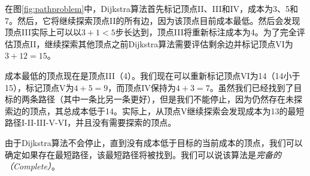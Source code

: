 
在图\ref{fig:pathproblem}中，Dijkstra算法首先标记顶点II、III和IV，成本为3、5和7。然后，它将继续探索顶点II的所有边，因为该顶点目前成本最低。然后会发现顶点III实际上可以以$3 + 1 <5$步长达到，顶点III将重新标注成本为4。为了完全评估顶点II，继续探索其他顶点之前Dijkstra算法需要评估剩余边并标记顶点VI为$3 + 12 = 15$。


成本最低的顶点现在是顶点III（4）。我们现在可以重新标记顶点VI为14（14小于15），标记顶点V为$4+5=9$，而顶点IV保持为$4+3=7$。虽然我们已经找到了目标的两条路径（其中一条比另一条更好），但是我们不能停止，因为仍然存在未探索边的顶点，其总成本低于14。实际上，从顶点V继续探索会发现成本为13的最短路径I-II-III-V-VI，并且没有需要探索的顶点。


由于Dijkstra算法不会停止，直到没有成本低于目标的当前成本的顶点，我们可以确定如果存在最短路径，该最短路径将被找到。我们可以说该算法是\emph{完备的（Complete）}。


